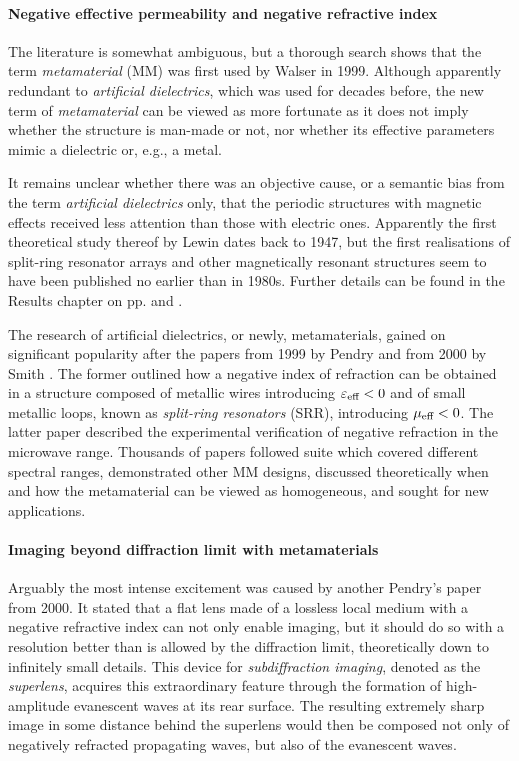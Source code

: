 \paragraph{Negative effective permeability and negative refractive index}  %
The literature is somewhat ambiguous, but a thorough search shows that the term \textit{metamaterial} (MM) was first used by Walser in 1999. Although apparently redundant to \textit{artificial dielectrics}, which was used for decades before,  the new term of \textit{metamaterial} can be viewed as more fortunate as it does not imply whether the structure is man-made or not, nor whether its effective parameters mimic a dielectric or, e.g., a metal.

It remains unclear whether there was an objective cause, or a semantic bias from the term \textit{artificial dielectrics} only, that the periodic structures with magnetic effects received less attention than those with electric ones. Apparently the first theoretical study thereof  by Lewin \cite{lewin1947electrical} dates back to 1947, but the first realisations of split-ring resonator arrays and other magnetically resonant structures seem to have been published no earlier than in 1980s. Further details can be found in the Results chapter on pp. \pageref{negn_srr} and \pageref{negn_diel}.

The research of artificial dielectrics, or newly, metamaterials, gained on significant popularity after the papers from 1999 by Pendry \cite{pendry1999magnetism} and from 2000 by Smith \cite{smith2000composite}. The former outlined how a negative index of refraction can be obtained in a structure composed of metallic wires introducing $\varepsilon_{\text{eff} }<0$ and of small metallic loops, known as \textit{split-ring resonators} (SRR), introducing $\mu_{\text{eff} }<0$. The latter paper described the experimental verification of negative refraction in the microwave range. Thousands of papers followed suite which covered different spectral ranges, demonstrated other MM designs, discussed theoretically when and how the metamaterial can be viewed as homogeneous, and sought for new applications. 

\paragraph{Imaging beyond diffraction limit with metamaterials} %
Arguably the most intense excitement was caused by another Pendry's paper \cite{pendry2000negative} from 2000. It stated that a flat lens made of a lossless local medium with a negative refractive index can not only enable imaging, but it should do so with a resolution better than is allowed by the diffraction limit, theoretically down to infinitely small details. This device for \textit{subdiffraction imaging}, denoted as the \textit{superlens}, acquires this extraordinary feature through the formation of high-amplitude evanescent waves at its rear surface. The resulting extremely sharp image in some distance behind the superlens would then be composed not only of negatively refracted propagating waves, but also of the evanescent waves.

